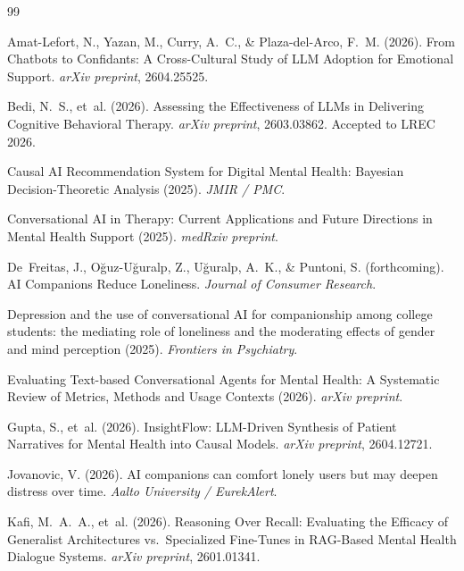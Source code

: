 \documentclass[12pt,a4paper]{article}
\begin{document}
\begin{thebibliography}{99}

Amat-Lefort, N., Yazan, M., Curry, A.~C., \& Plaza-del-Arco, F.~M. (2026).
\newblock From Chatbots to Confidants: A Cross-Cultural Study of LLM Adoption for Emotional Support.
\newblock \textit{arXiv preprint}, 2604.25525.

Bedi, N.~S., et~al. (2026).
\newblock Assessing the Effectiveness of LLMs in Delivering Cognitive Behavioral Therapy.
\newblock \textit{arXiv preprint}, 2603.03862. Accepted to LREC 2026.

Causal AI Recommendation System for Digital Mental Health: Bayesian Decision-Theoretic Analysis (2025).
\newblock \textit{JMIR / PMC}.

Conversational AI in Therapy: Current Applications and Future Directions in Mental Health Support (2025).
\newblock \textit{medRxiv preprint}.

De~Freitas, J., O\u{g}uz-U\u{g}uralp, Z., U\u{g}uralp, A.~K., \& Puntoni, S. (forthcoming).
\newblock AI Companions Reduce Loneliness.
\newblock \textit{Journal of Consumer Research}.

Depression and the use of conversational AI for companionship among college students: the mediating role of loneliness and the moderating effects of gender and mind perception (2025).
\newblock \textit{Frontiers in Psychiatry}.

Evaluating Text-based Conversational Agents for Mental Health: A Systematic Review of Metrics, Methods and Usage Contexts (2026).
\newblock \textit{arXiv preprint}.

Gupta, S., et~al. (2026).
\newblock InsightFlow: LLM-Driven Synthesis of Patient Narratives for Mental Health into Causal Models.
\newblock \textit{arXiv preprint}, 2604.12721.

Jovanovic, V. (2026).
\newblock AI companions can comfort lonely users but may deepen distress over time.
\newblock \textit{Aalto University / EurekAlert}.

Kafi, M.~A.~A., et~al. (2026).
\newblock Reasoning Over Recall: Evaluating the Efficacy of Generalist Architectures vs.\ Specialized Fine-Tunes in RAG-Based Mental Health Dialogue Systems.
\newblock \textit{arXiv preprint}, 2601.01341.


\end{thebibliography}
\end{document}
